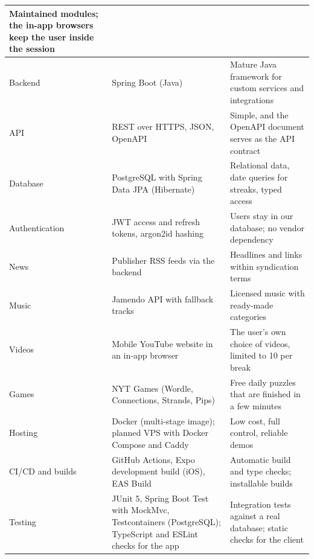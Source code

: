 \begin{longtable}{|>{\raggedright\arraybackslash}p{3.2cm}|>{\raggedright\arraybackslash}p{5.2cm}|>{\raggedright\arraybackslash}p{6cm}|}
Maintained modules; the in-app browsers keep the user inside the session \\ \hline

Backend & Spring Boot (Java) &

Mature Java framework for custom services and integrations \\ \hline

API & REST over HTTPS, JSON, OpenAPI &

Simple, and the OpenAPI document serves as the API contract \\ \hline

Database & PostgreSQL with Spring Data JPA (Hibernate) &

Relational data, date queries for streaks, typed access \\ \hline

Authentication & JWT access and refresh tokens, argon2id hashing &

Users stay in our database; no vendor dependency \\ \hline

News & Publisher RSS feeds via the backend &

Headlines and links within syndication terms \\ \hline

Music & Jamendo API with fallback tracks &

Licensed music with ready-made categories \\ \hline

Videos & Mobile YouTube website in an in-app browser &

The user's own choice of videos, limited to 10 per break \\ \hline

Games & NYT Games (Wordle, Connections, Strands, Pips) &

Free daily puzzles that are finished in a few minutes \\ \hline

Hosting & Docker (multi-stage image); planned VPS with Docker Compose and Caddy &

Low cost, full control, reliable demos \\ \hline

CI/CD and builds & GitHub Actions, Expo development build (iOS), EAS Build &

Automatic build and type checks; installable builds \\ \hline

Testing & JUnit 5, Spring Boot Test with MockMvc, Testcontainers (PostgreSQL); TypeScript and ESLint checks for the app &

Integration tests against a real database; static checks for the client \\ \hline

\end{longtable}

\endgroup